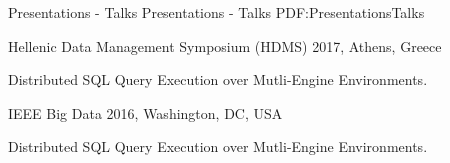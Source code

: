 \Section
{Presentations - Talks}
{Presentations - Talks}
{PDF:PresentationsTalks}

\BulletItem
Hellenic Data Management Symposium (HDMS) 2017, Athens, Greece
\hfill
{}
\begin{Detail}
	\Item
	Distributed SQL Query Execution over Mutli-Engine Environments.
\end{Detail}
\BulletItem
IEEE Big Data 2016, Washington, DC, USA
\hfill
{}
\begin{Detail}
	\Item
	Distributed SQL Query Execution over Mutli-Engine Environments.
\end{Detail}